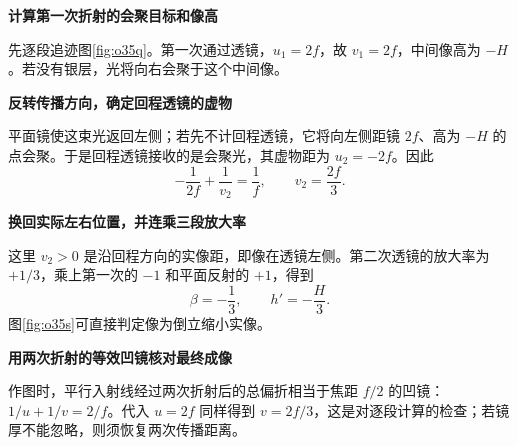 \begin{solution}\textbf{计算第一次折射的会聚目标和像高}\par\nobreak
先逐段追迹图\ref{fig:o35q}。第一次通过透镜，\(u_1=2f\)，故 \(v_1=2f\)，中间像高为 \(-H\)。若没有银层，光将向右会聚于这个中间像。



\par\medskip{}\noindent\textbf{反转传播方向，确定回程透镜的虚物}\par\nobreak
平面镜使这束光返回左侧；若先不计回程透镜，它将向左侧距镜 \(2f\)、高为 \(-H\) 的点会聚。于是回程透镜接收的是会聚光，其虚物距为 \(u_2=-2f\)。因此
\[
 -\frac1{2f}+\frac1{v_2}=\frac1f,
 \qquad \boxed{v_2=\frac{2f}{3}}.
\]


\par\medskip{}\noindent\textbf{换回实际左右位置，并连乘三段放大率}\par\nobreak
这里 \(v_2>0\) 是沿回程方向的实像距，即像在透镜左侧。第二次透镜的放大率为 \(+1/3\)，乘上第一次的 \(-1\) 和平面反射的 \(+1\)，得到
\[
 \boxed{\beta=-\frac13,\qquad h'=-\frac H3}.
\]
图\ref{fig:o35s}可直接判定像为倒立缩小实像。



\par\medskip{}\noindent\textbf{用两次折射的等效凹镜核对最终成像}\par\nobreak
作图时，平行入射线经过两次折射后的总偏折相当于焦距 \(f/2\) 的凹镜：\(1/u+1/v=2/f\)。代入 \(u=2f\) 同样得到 \(v=2f/3\)，这是对逐段计算的检查；若镜厚不能忽略，则须恢复两次传播距离。
\end{solution}

